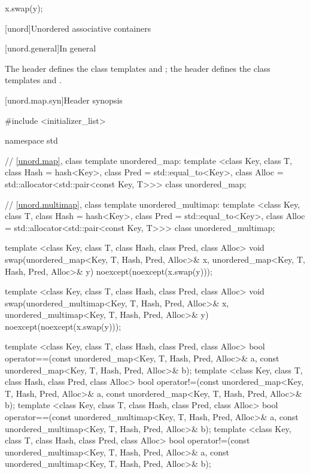 \begin{itemdescr}
\pnum
\effects
\begin{codeblock}
x.swap(y);
\end{codeblock}
\end{itemdescr}

[unord]{Unordered associative containers}

[unord.general]{In general}

\pnum
The header  defines the class templates
 and
; the header  defines the class templates
 and .

[unord.map.syn]{Header  synopsis}%
%
%
%
\begin{codeblock}
#include <initializer_list>

namespace std {
  // \ref{unord.map}, class template unordered_map:
  template <class Key,
            class T,
            class Hash = hash<Key>,
            class Pred = std::equal_to<Key>,
            class Alloc = std::allocator<std::pair<const Key, T>>>
    class unordered_map;

  // \ref{unord.multimap}, class template unordered_multimap:
  template <class Key,
            class T,
            class Hash = hash<Key>,
            class Pred = std::equal_to<Key>,
            class Alloc = std::allocator<std::pair<const Key, T>>>
    class unordered_multimap;

  template <class Key, class T, class Hash, class Pred, class Alloc>
    void swap(unordered_map<Key, T, Hash, Pred, Alloc>& x,
              unordered_map<Key, T, Hash, Pred, Alloc>& y)
      noexcept(noexcept(x.swap(y)));

  template <class Key, class T, class Hash, class Pred, class Alloc>
    void swap(unordered_multimap<Key, T, Hash, Pred, Alloc>& x,
              unordered_multimap<Key, T, Hash, Pred, Alloc>& y)
      noexcept(noexcept(x.swap(y)));

  template <class Key, class T, class Hash, class Pred, class Alloc>
    bool operator==(const unordered_map<Key, T, Hash, Pred, Alloc>& a,
                    const unordered_map<Key, T, Hash, Pred, Alloc>& b);
  template <class Key, class T, class Hash, class Pred, class Alloc>
    bool operator!=(const unordered_map<Key, T, Hash, Pred, Alloc>& a,
                    const unordered_map<Key, T, Hash, Pred, Alloc>& b);
  template <class Key, class T, class Hash, class Pred, class Alloc>
    bool operator==(const unordered_multimap<Key, T, Hash, Pred, Alloc>& a,
                    const unordered_multimap<Key, T, Hash, Pred, Alloc>& b);
  template <class Key, class T, class Hash, class Pred, class Alloc>
    bool operator!=(const unordered_multimap<Key, T, Hash, Pred, Alloc>& a,
                    const unordered_multimap<Key, T, Hash, Pred, Alloc>& b);
}
\end{codeblock}

